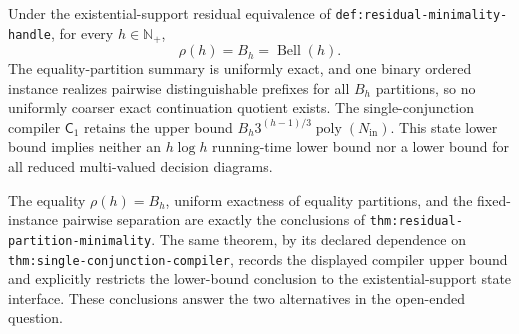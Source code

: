 Under the existential-support residual equivalence of \texttt{def:residual-minimality-handle}, for every \(h\in\mathbb N_{+}\),
\[
 \rho(h)=B_h=\operatorname{Bell}(h).
\]
The equality-partition summary is uniformly exact, and one binary ordered instance realizes pairwise distinguishable prefixes for all \(B_h\) partitions, so no uniformly coarser exact continuation quotient exists.  The single-conjunction compiler \(\mathsf C_1\) retains the upper bound \(B_h3^{(h-1)/3}\operatorname{poly}(N_{\mathrm{in}})\).  This state lower bound implies neither an \(h\log h\) running-time lower bound nor a lower bound for all reduced multi-valued decision diagrams.

The equality \(\rho(h)=B_h\), uniform exactness of equality partitions, and the fixed-instance pairwise separation are exactly the conclusions of \texttt{thm:residual-partition-minimality}.  The same theorem, by its declared dependence on \texttt{thm:single-conjunction-compiler}, records the displayed compiler upper bound and explicitly restricts the lower-bound conclusion to the existential-support state interface.  These conclusions answer the two alternatives in the open-ended question.
